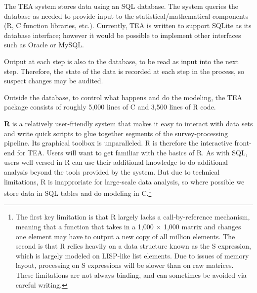 \documentclass{article}
\begin{document}
The TEA system stores data using an SQL database. The system queries the database as
needed to provide input to the statistical/mathematical components (R, C function libraries, etc.).
Currently, TEA is written to support SQLite as its database interface; however it would
be possible to implement other interfaces such as Oracle or MySQL. 

Output at each step is also to the database, to be read as input into the next
step. Therefore, the state of the data is recorded at each step in the process, so
suspect changes may be audited.

Outside the database, to control what happens and
do the modeling, the TEA package consists of roughly 5,000 lines of C and 3,500 lines of R code.
\comment{

}

{\bf R} is a relatively user-friendly system that makes it easy to interact with data
sets and write quick scripts to glue together segments of the survey-processing pipeline.
Its graphical toolbox is unparalleled.
R is therefore the interactive front-end for TEA. Users will want to get familiar with the basics of
R.  As with SQL, users well-versed in R can use their additional knowledge to do additional
analysis beyond the tools provided by the system. But due to technical limitations, R is
inapproriate for large-scale data analysis, so where possible we store data in SQL
tables and do modeling in C.\footnote{The first key limitation is that R largely lacks a
call-by-reference mechanism, meaning that a function that takes in a 1,000 $\times$ 1,000
matrix and changes one element may have to output a new copy of all million elements. The second is that R
relies heavily on a data structure known as the S expression, which is largely modeled
on LISP-like list elements. Due to issues of memory layout, processing on S expressions
will be slower than on raw matrices. These limitations are not always binding, and
can sometimes be avoided via careful writing.}
\end{document}
